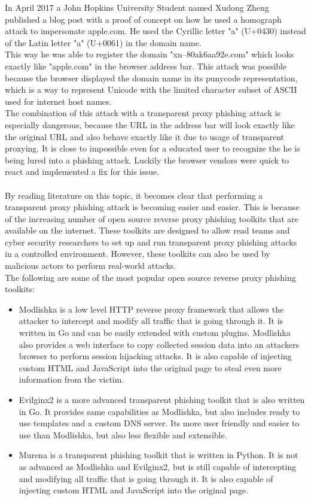 \documentclass[12pt]{scrbook}
\begin{document}
In April 2017 a John Hopkins University Student named Xudong Zheng published a
blog post with a proof of concept on how he used a homograph attack to
impersonate apple.com. He used the Cyrillic letter "a" (U+0430) instead of the
Latin letter "a" (U+0061) in the domain name.\\This way he was able to register
the domain "xn--80ak6aa92e.com" which looks exactly like "apple.com" in the
browser address bar. This attack was possible because the browser displayed the
domain name in its punycode representation, which is a way to represent Unicode
with the limited character subset of ASCII used for internet host names.\\ The
combination of this attack with a transparent proxy phishing attack is
especially dangerous, because the URL in the address bar will look exactly like
the original URL and also behave exactly like it due to usage of transparent
proxying. It is close to impossible even for a educated user to recognize the he
is being lured into a phishing attack. Luckily the browser vendors were quick to
react and implemented a fix for this issue.\\ \\ By reading literature on this
topic, it becomes clear that performing a transparent proxy phishing attack is
becoming easier and easier. This is because of the increasing number of open
source reverse proxy phishing toolkits that are available on the internet. These
toolkits are designed to allow read teams and cyber security researchers to set
up and run transparent proxy phishing attacks in a controlled environment.
However, these toolkits can also be used by malicious actors to perform
real-world attacks.\\The following are some of the most popular open source
reverse proxy phishing toolkits: \begin{itemize} \item Modlishka
  \cite{modlishka} is a low level HTTP reverse proxy framework that allows the
  attacker to intercept and modify all traffic that is going through it. It is
  written in Go and can be easily extended with custom plugins. Modlishka also
  provides a web interface to copy collected session data into an attackers
  browser to perform session hijacking attacks. It is also capable of injecting
  custom HTML and JavaScript into the original page to steal even more
  information from the victim.

  \item Evilginx2 \cite{evilginx2} is a more advanced transparent phishing
    toolkit that is also written in Go. It provides same capabilities as
    Modlishka, but also includes ready to use templates and a custom DNS server.
    Its more user friendly and easier to use than Modlishka, but also less
    flexible and extensible.

  \item Murena \cite{murena} is a transparent phishing toolkit that is written
    in Python. It is not as advanced as Modlishka and Evilginx2, but is still
    capable of intercepting and modifying all traffic that is going through it.
    It is also capable of injecting custom HTML and JavaScript into the original
page. \end{itemize}
\end{document}

